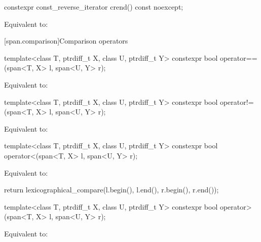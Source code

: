 \begin{codeblock}
\begin{codeblock}
\begin{codeblock}
%
\begin{itemdecl}
constexpr const_reverse_iterator crend() const noexcept;
\end{itemdecl}
\begin{itemdescr}
\pnum
\effects
Equivalent to: 
\end{itemdescr}

[span.comparison]{Comparison operators}

%
\begin{itemdecl}
template<class T, ptrdiff_t X, class U, ptrdiff_t Y>
  constexpr bool operator==(span<T, X> l, span<U, Y> r);
\end{itemdecl}
\begin{itemdescr}
\pnum
\effects
Equivalent to: 
\end{itemdescr}

%
\begin{itemdecl}
template<class T, ptrdiff_t X, class U, ptrdiff_t Y>
  constexpr bool operator!=(span<T, X> l, span<U, Y> r);
\end{itemdecl}
\begin{itemdescr}
\pnum
\effects
Equivalent to: 
\end{itemdescr}

%
\begin{itemdecl}
template<class T, ptrdiff_t X, class U, ptrdiff_t Y>
  constexpr bool operator<(span<T, X> l, span<U, Y> r);
\end{itemdecl}
\begin{itemdescr}
\pnum
\effects
Equivalent to:
\begin{codeblock}
return lexicographical_compare(l.begin(), l.end(), r.begin(), r.end());
\end{codeblock}
\end{itemdescr}

%
\begin{itemdecl}
template<class T, ptrdiff_t X, class U, ptrdiff_t Y>
  constexpr bool operator>(span<T, X> l, span<U, Y> r);
\end{itemdecl}
\begin{itemdescr}
\pnum
\effects
Equivalent to: 
\end{itemdescr}


\end{codeblock}
\end{codeblock}
\end{codeblock}
